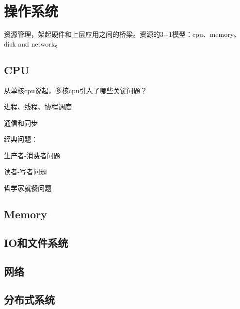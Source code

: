 \chapter{操作系统}

资源管理，架起硬件和上层应用之间的桥梁。资源的3+1模型：cpu、memory、disk and network。

\section{CPU}

从单核cpu说起，多核cpu引入了哪些关键问题？

进程、线程、协程调度

通信和同步

经典问题：
\begin{compactenum}
\item 生产者-消费者问题
\item 读者-写者问题
\item 哲学家就餐问题
\end{compactenum}

\section{Memory}

\section{IO和文件系统}

\section{网络}

\section{分布式系统}

